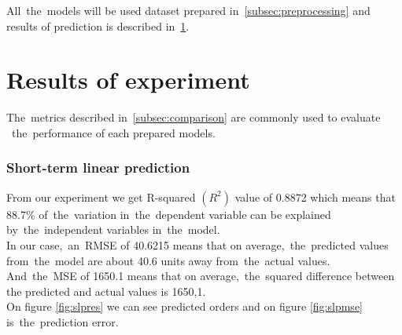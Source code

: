 All~the~models will be used dataset prepared in~\ref{subsec:preprocessing} and results of prediction is
described in~\ref{subsec:experimentResults}.
\section{Results of experiment}\label{subsec:experimentResults}
    The~metrics described in~\ref{subsec:comparison} are commonly used to evaluate
    ~the~performance of each prepared models.
    \subsubsection{Short-term linear prediction} \label{subsec:res_slp}
    From our experiment we get R-squared $(R^2)$ value of 0.8872 which means that
    88.7\% of~the~variation in~the~dependent variable can be explained
    by~the~independent variables in~the~model.\\
    In our case,~an~RMSE of 40.6215 means that on average,~the~predicted values
    from~the~model are about 40.6 units away from~the~actual values.
    And~the~MSE of 1650.1 means that on average,~the~squared difference between the
    predicted and actual values is 1650,1.\\
    On figure \ref{fig:slpres} we can see predicted orders and on figure \ref{fig:slpmse}
    is~the~prediction error. 
